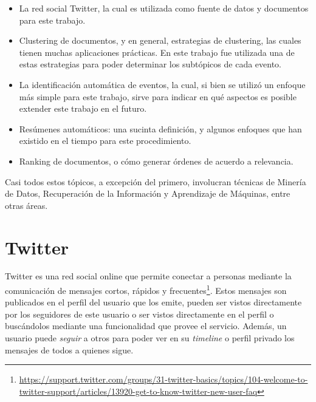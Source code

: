 \documentclass[upright, contnum]{umemoria}
\begin{document}
\begin{itemize}
\item La red social Twitter, la cual es utilizada como fuente de datos y
    documentos para este trabajo.
\item Clustering de documentos, y en general, estrategias de clustering,
    las cuales tienen muchas aplicaciones prácticas. En este trabajo
    fue utilizada una de estas estrategias para poder determinar los
    subtópicos de cada evento.
\item La identificación automática de eventos, la cual, si bien se
    utilizó un enfoque más simple para este trabajo, sirve para
    indicar en qué aspectos es posible extender este trabajo en el
    futuro.
\item Resúmenes automáticos: una sucinta definición, y algunos enfoques
    que han existido en el tiempo para este procedimiento.
\item Ranking de documentos, o cómo generar órdenes de acuerdo a
    relevancia.
\end{itemize}
  Casi todos estos tópicos, a excepción del primero, involucran
  técnicas de Minería de Datos, Recuperación de la Información y
  Aprendizaje de Máquinas, entre otras áreas.

\section{Twitter}
\label{sec-2.1}

   Twitter es una red social online que permite conectar a
   personas mediante la comunicación de mensajes cortos, rápidos y   frecuentes\footnote{\href{https://support.twitter.com/groups/31-twitter-basics/topics/104-welcome-to-twitter-support/articles/13920-get-to-know-twitter-new-user-faq}{https://support.twitter.com/groups/31-twitter-basics/topics/104-welcome-to-twitter-support/articles/13920-get-to-know-twitter-new-user-faq} }. Estos
   mensajes son publicados en el perfil del usuario que los emite,
   pueden ser vistos directamente por los seguidores de este usuario o
   ser vistos directamente en el perfil o buscándolos mediante una
   funcionalidad que provee el servicio. Además, un usuario puede
   \emph{seguir} a otros para poder ver en su \emph{timeline} o perfil privado 
   los mensajes de todos a quienes sigue.
   
\end{document}

